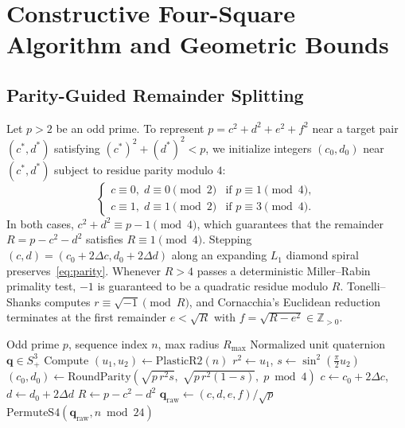 \documentclass[conference]{IEEEtran}
\begin{document}
\section{Constructive Four-Square Algorithm and Geometric Bounds}

\subsection{Parity-Guided Remainder Splitting}
Let $p > 2$ be an odd prime. To represent $p = c^2 + d^2 + e^2 + f^2$ near a target pair $(c^*, d^*)$ satisfying $(c^*)^2 + (d^*)^2 < p$, we initialize integers $(c_0, d_0)$ near $(c^*, d^*)$ subject to residue parity modulo $4$:
\begin{equation}
\begin{cases}
c \equiv 0,\; d \equiv 0 \pmod 2 & \text{if } p \equiv 1 \pmod 4, \\
c \equiv 1,\; d \equiv 1 \pmod 2 & \text{if } p \equiv 3 \pmod 4.
\end{cases}
\label{eq:parity}
\end{equation}
In both cases, $c^2 + d^2 \equiv p - 1 \pmod 4$, which guarantees that the remainder $R = p - c^2 - d^2$ satisfies $R \equiv 1 \pmod 4$. Stepping $(c, d) = (c_0 + 2\Delta c, d_0 + 2\Delta d)$ along an expanding $L_1$ diamond spiral preserves~\eqref{eq:parity}. Whenever $R > 4$ passes a deterministic Miller--Rabin primality test, $-1$ is guaranteed to be a quadratic residue modulo $R$. Tonelli--Shanks computes $r \equiv \sqrt{-1} \pmod R$, and Cornacchia's Euclidean reduction terminates at the first remainder $e < \sqrt{R}$ with $f = \sqrt{R - e^2} \in \mathbb{Z}_{>0}$.

\begin{algorithm}[t]
\caption{Haar-Steered Balanced Four-Square Prime Solver}
\label{alg:haar4sq}
\begin{algorithmic}[1]
\REQUIRE Odd prime $p$, sequence index $n$, max radius $R_{\max}$
\ENSURE Normalized unit quaternion $\mathbf{q} \in S^3_+$
\STATE Compute $(u_1, u_2) \leftarrow \text{PlasticR2}(n)$
\STATE $r^2 \leftarrow u_1$, \quad $s \leftarrow \sin^2\left(\frac{\pi}{2} u_2\right)$
\STATE $(c_0, d_0) \leftarrow \text{RoundParity}\left(\sqrt{p\,r^2 s},\; \sqrt{p\,r^2 (1-s)},\; p \bmod 4\right)$
        \STATE $c \leftarrow c_0 + 2\Delta c$, \quad $d \leftarrow d_0 + 2\Delta d$
            \STATE $R \leftarrow p - c^2 - d^2$
                    \STATE $\mathbf{q}_{\text{raw}} \leftarrow (c, d, e, f) / \sqrt{p}$
                    \RETURN $\text{PermuteS4}(\mathbf{q}_{\text{raw}}, n \bmod 24)$
                \ENDIF
            \ENDIF
        \ENDIF
    \ENDFOR
\ENDFOR
\end{algorithmic}
\end{algorithm}
\end{document}
